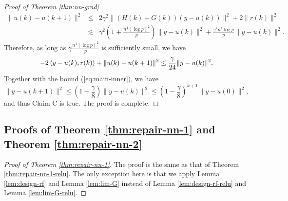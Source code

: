 \begin{proof}[Proof of Theorem \ref{thm:nn-grad}]
\begin{eqnarray*}
\|u(k)-u(k+1)\|^2 &\leq& 2\gamma^2\|(H(k)+G(k))(y-u(k))\|^2 + 2\|r(k)\|^2 \\
&\lesssim& \gamma^2\left(1+\frac{n^4(\log p)^2}{p}\right)\|y-u(k)\|^2 + \frac{\gamma^4n^4\log p}{p}\|y-u(k)\|^2 .
\end{eqnarray*}
Therefore, as long as $\gamma\frac{n^4(\log p)^2}{p}$ is sufficiently small, we have
$$- 2\left \langle y-u(k), r(k) \right\rangle + \|u(k)-u(k+1)\|^2 \leq \frac{\gamma}{24}\|y-u(k)\|^2.$$
Together with the bound (\ref{eq:main-inner}), we have
$$\|y-u(k+1)\|^2 \leq \left(1-\frac{\gamma}{8}\right)\|y-u(k)\|^2\leq \left(1-\frac{\gamma}{8}\right)^{k+1}\|y-u(0)\|^2,$$
and thus Claim C is true. The proof is complete.
\end{proof}


\subsection{Proofs of Theorem \ref{thm:repair-nn-1} and Theorem \ref{thm:repair-nn-2}}

\begin{proof}[Proof of Theorem \ref{thm:repair-nn-1}]
The proof is the same as that of Theorem \ref{thm:repair-nn-1-relu}. The only exception here is that we apply Lemma \ref{lem:design-rf} and Lemma \ref{lem:lim-G} instead of Lemma \ref{lem:design-rf-relu} and Lemma \ref{lem:lim-G-relu}.
\end{proof}

